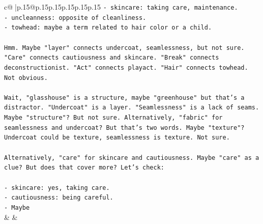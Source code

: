 \documentclass{article}
\begin{document}
{\begin{supertabular}{c@{$\;$}|p{.15\linewidth}@{}p{.15\linewidth}p{.15\linewidth}p{.15\linewidth}p{.15\linewidth}p{.15\linewidth}}
{{{\texttt{{-} skincare: taking care, maintenance.} \\
\texttt{{-} uncleanness: opposite of cleanliness.} \\
\texttt{{-} towhead: maybe a term related to hair color or a child.} \\
\\ 
\texttt{Hmm. Maybe "layer" connects undercoat, seamlessness, but not sure. "Care" connects cautiousness and skincare. "Break" connects deconstructionist. "Act" connects playact. "Hair" connects towhead. Not obvious.} \\
\\ 
\texttt{Wait, "glasshouse" is a structure, maybe "greenhouse" but that's a distractor. "Undercoat" is a layer. "Seamlessness" is a lack of seams. Maybe "structure"? But not sure. Alternatively, "fabric" for seamlessness and undercoat? But that's two words. Maybe "texture"? Undercoat could be texture, seamlessness is texture. Not sure.} \\
\\ 
\texttt{Alternatively, "care" for skincare and cautiousness. Maybe "care" as a clue? But does that cover more? Let's check:} \\
\\ 
\texttt{{-} skincare: yes, taking care.} \\
\texttt{{-} cautiousness: being careful.} \\
\texttt{{-} Maybe} \\
            }
        }
    }
    & & \\ \\


\end{supertabular}}
\end{document}
